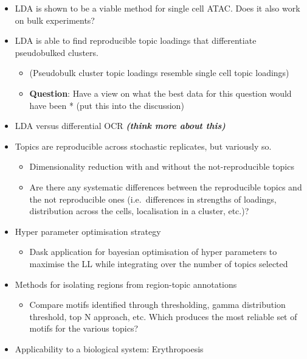 \begin{itemize}
    \tightlist
    \item
      LDA is shown to be a viable method for single cell ATAC. Does it also
      work on bulk experiments?
    \item
      LDA is able to find reproducible topic loadings that differentiate
      pseudobulked clusters.
    
      \begin{itemize}
      \tightlist
      \item
        (Pseudobulk cluster topic loadings resemble single cell topic
        loadings)
      \item
        \textbf{Question}: Have a view on what the best data for this
        question would have been * (put this into the discussion)
      \end{itemize}
    \item
      LDA versus differential OCR \textbf{\emph{(think more about this)}}
    \item
      Topics are reproducible across stochastic replicates, but variously
      so.
    
      \begin{itemize}
      \tightlist
      \item
        Dimensionality reduction with and without the not-reproducible
        topics
      \item
        Are there any systematic differences between the reproducible topics
        and the not reproducible ones (i.e.~differences in strengths of
        loadings, distribution across the cells, localisation in a cluster,
        etc.)?
      \end{itemize}
    \item
      Hyper parameter optimisation strategy
    
      \begin{itemize}
      \tightlist
      \item
        Dask application for bayesian optimisation of hyper parameters to
        maximise the LL while integrating over the number of topics selected
      \end{itemize}
    \item
      Methods for isolating regions from region-topic annotations
    
      \begin{itemize}
      \tightlist
      \item
        Compare motifs identified through thresholding, gamma distribution
        threshold, top N approach, etc. Which produces the most reliable set
        of motifs for the various topics?
      \end{itemize}
    \item
      Applicability to a biological system: Erythropoesis
    

\end{itemize}
